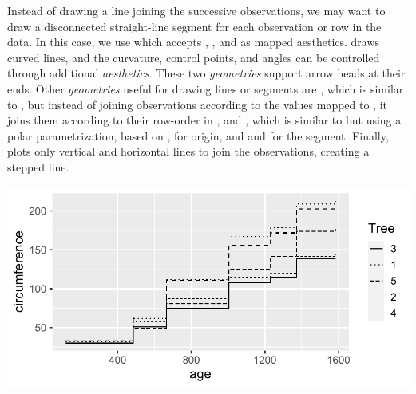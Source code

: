 \documentclass[krantz2]{krantz}\usepackage{knitr}
\begin{document}
Instead of drawing a line joining the successive observations, we may want to draw a disconnected straight-line segment for each observation or row in the data. In this case, we use  which accepts , ,  and  as mapped aesthetics.  draws curved lines, and the curvature, control points, and angles can be controlled through additional \emph{aesthetics}. These two \emph{geometries} support arrow heads at their ends. Other \emph{geometries} useful for drawing lines or segments are , which is similar to , but instead of joining observations according to the values mapped to , it joins them according to their row-order in , and , which is similar to  but using a polar parametrization, based on ,  for origin, and  and  for the segment. Finally,  plots only vertical and horizontal lines to join the observations, creating a stepped line.

\begin{knitrout}\footnotesize
{}\color{fgcolor}\begin{kframe}
\begin{alltt}
\hlstd{(} 
       \hlstd{(}      \hlopt{+}
  \hlstd{()}
\end{alltt}
\end{kframe}

{\centering \includegraphics[width=.7\textwidth]{figure/pos-step-plot-01-1}

}



\end{knitrout}
\end{document}
